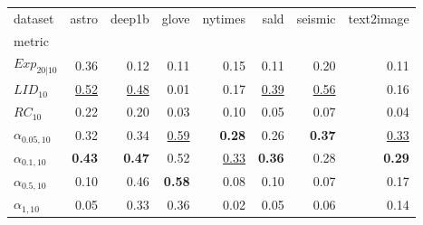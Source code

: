 \begin{tabular}{lrrrrrrr}
dataset & astro & deep1b & glove & nytimes & sald & seismic & text2image \\
metric &  &  &  &  &  &  &  \\
$Exp_{20|10}$ & 0.36 & 0.12 & 0.11 & 0.15 & 0.11 & 0.20 & 0.11 \\
$LID_{10}$ & \underline{0.52} & \underline{0.48} & 0.01 & 0.17 & \underline{0.39} & \underline{0.56} & 0.16 \\
$RC_{10}$ & 0.22 & 0.20 & 0.03 & 0.10 & 0.05 & 0.07 & 0.04 \\
$\alpha_{0.05, 10}$ & 0.32 & 0.34 & \underline{0.59} & \textbf{0.28} & 0.26 & \textbf{0.37} & \underline{0.33} \\
$\alpha_{0.1, 10}$ & \textbf{0.43} & \textbf{0.47} & 0.52 & \underline{0.33} & \textbf{0.36} & 0.28 & \textbf{0.29} \\
$\alpha_{0.5, 10}$ & 0.10 & 0.46 & \textbf{0.58} & 0.08 & 0.10 & 0.07 & 0.17 \\
$\alpha_{1, 10}$ & 0.05 & 0.33 & 0.36 & 0.02 & 0.05 & 0.06 & 0.14 \\
\end{tabular}
